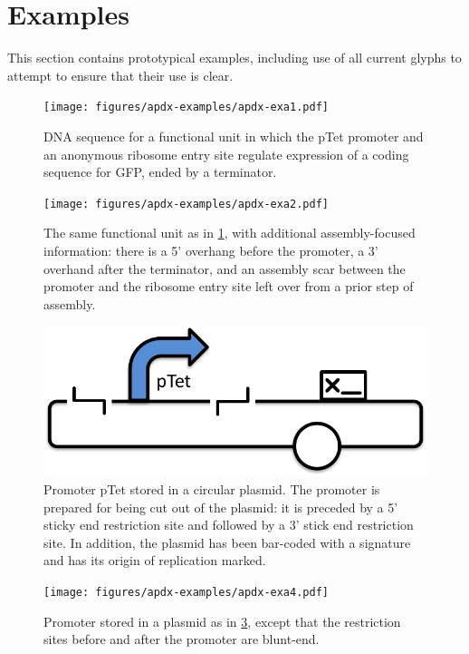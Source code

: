 \section{Examples}\label{sec:examples}

This section contains prototypical examples, including use of all
current glyphs to attempt to ensure that their use is clear.

\begin{figure}[h!]
\texttt{[image: figures/apdx-examples/apdx-exa1.pdf]}
\caption{DNA sequence for a functional unit in which the pTet promoter and an anonymous ribosome entry site regulate expression of a coding sequence for GFP, ended by a terminator.}
\label{f:apdx:exa1}
\end{figure}

\begin{figure}[h!]
\texttt{[image: figures/apdx-examples/apdx-exa2.pdf]}
\caption{The same functional unit as in \ref{f:apdx:exa1}, with additional assembly-focused information: there is a 5' overhang before the promoter, a 3' overhand after the terminator, and an assembly scar between the promoter and the ribosome entry site left over from a prior step of assembly.}
\label{f:apdx:exa2}
\end{figure}

\begin{figure}[h!]
\includegraphics[scale=0.5]{figures/apdx-examples/apdx-exa3.pdf}
\caption{Promoter pTet stored in a circular plasmid. The promoter is prepared for being cut out of the plasmid: it is preceded by a 5' sticky end restriction site and followed by a 3' stick end restriction site.  In addition, the plasmid has been bar-coded with a signature and has its origin of replication marked.}
\label{f:apdx:exa3}
\end{figure}

\begin{figure}[h!]
\texttt{[image: figures/apdx-examples/apdx-exa4.pdf]}
\caption{Promoter stored in a plasmid as in \ref{f:apdx:exa3}, except that the restriction sites before and after the promoter are blunt-end.}
\label{f:apdx:exa4}
\end{figure}

